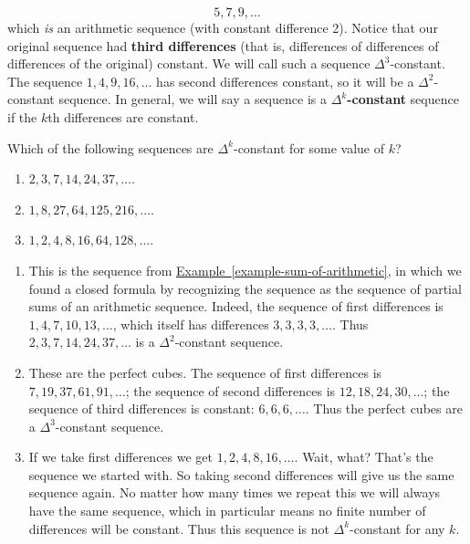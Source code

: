 \documentclass[11pt,]{book}
\newcommand{\terminology}[1]{\textbf{#1}}
\theoremstyle{ptxplainnotitle}
\theoremstyle{ptxplaintitle}
\theoremstyle{ptxdefinitionnotitle}
\theoremstyle{ptxdefinitiontitle}
\theoremstyle{ptxdefinitionnotitle}
\theoremstyle{ptxdefinitiontitle}
\theoremstyle{ptxdefinitionnotitle}
\theoremstyle{ptxdefinitiontitle}
\theoremstyle{ptxdefinitiontitlenonumber}
\theoremstyle{ptxdefinitiontitlenonumber}
\numberwithin{equation}{chapter}
\begin{document}
\begin{equation*}
5, 7, 9, \ldots
\end{equation*}
which \emph{is} an arithmetic sequence (with constant difference 2). Notice that our original sequence had \terminology{third differences} (that is, differences of differences of differences of the original) constant. We will call such a sequence \(\Delta^3\)-constant. The sequence \(1, 4, 9, 16, \ldots\) has second differences constant, so it will be a \(\Delta^2\)-constant sequence. In general, we will say a sequence is a \terminology{\(\Delta^k\)-constant}\label{notation-4}
 sequence if the \(k\)th differences are constant.%
\begin{example}\label{example-deltak}
\hypertarget{p-346}{}%
Which of the following sequences are \(\Delta^k\)-constant for some value of \(k\)? \leavevmode%
\begin{enumerate}
\item\hypertarget{li-195}{}\(2, 3, 7, 14, 24, 37,\ldots\).%
\item\hypertarget{li-196}{}\(1, 8, 27, 64, 125, 216, \ldots\).%
\item\hypertarget{li-197}{}\(1,2,4,8,16,64,128,\ldots\).%
\end{enumerate}
%
\par\smallskip%
\noindent\textbf{}\hypertarget{solution-45}{}\hypertarget{p-347}{}%
\leavevmode%
\begin{enumerate}
\item\hypertarget{li-198}{}This is the sequence from \hyperref[example-sum-of-arithmetic]{Example~\ref{example-sum-of-arithmetic}}, in which we found a closed formula by recognizing the sequence as the sequence of partial sums of an arithmetic sequence. Indeed, the sequence of first differences is \(1,4,7, 10, 13,\ldots\), which itself has differences \(3,3,3,3,\ldots\). Thus \(2, 3, 7, 14, 24, 37,\ldots\) is a \(\Delta^2\)-constant sequence.%
\item\hypertarget{li-199}{}These are the perfect cubes. The sequence of first differences is \(7, 19, 37, 61, 91, \ldots\); the sequence of second differences is \(12, 18, 24, 30,\ldots\); the sequence of third differences is constant: \(6,6,6,\ldots\). Thus the perfect cubes are a \(\Delta^3\)-constant sequence.%
\item\hypertarget{li-200}{}If we take first differences we get \(1,2,4,8,16,\ldots\). Wait, what? That's the sequence we started with. So taking second differences will give us the same sequence again. No matter how many times we repeat this we will always have the same sequence, which in particular means no finite number of differences will be constant. Thus this sequence is not \(\Delta^k\)-constant for any \(k\).%
\end{enumerate}
%
\end{example}
\end{document}
